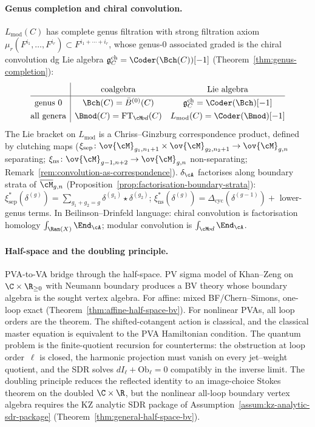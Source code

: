 \paragraph{Genus completion and chiral convolution.}
$L_{\mathrm{mod}}(C)$ has complete genus filtration with strong
filtration axiom $\mu_r(F^{i_1}, \ldots, F^{i_r}) \subset
F^{i_1 + \cdots + i_r}$, whose genus-$0$ associated graded is
the chiral convolution dg Lie algebra
$\mathfrak{g}^{\mathrm{ch}}_C = \Coder(\Bch(C))[-1]$
(Theorem~\ref{thm:genus-completion}):
\[
\renewcommand{\arraystretch}{1.3}
\begin{array}{@{}c|cc@{}}
 & \text{coalgebra} & \text{Lie algebra} \\
\hline
\text{genus } 0
 & \Bch(C) = \bar{B}^{(0)}(C)
 & \mathfrak{g}^{\mathrm{ch}}_C = \Coder(\Bch)[-1]
 \\
\text{all genera}
 & \Bmod(C) = \mathrm{FT}_{\cM\!od}(C)
 & L_{\mathrm{mod}}(C) = \Coder(\Bmod)[-1]
\end{array}
\]
The Lie bracket on $L_{\mathrm{mod}}$ is a Chriss--Ginzburg
correspondence product, defined by clutching maps
($\xi_{\mathrm{sep}}\colon \ov{\cM}_{g_1,n_1+1} \times
\ov{\cM}_{g_2,n_2+1} \to \ov{\cM}_{g,n}$ separating;
$\xi_{\mathrm{ns}}\colon \ov{\cM}_{g-1,n+2} \to \ov{\cM}_{g,n}$
non-separating;
Remark~\ref{rem:convolution-as-correspondence}).
$\delta_\cA$ factorises along boundary strata of
$\overline{\cM}_{g,n}$
(Proposition~\ref{prop:factorisation-boundary-strata}):
$\xi_{\mathrm{sep}}^*(\delta^{(g)}) = \sum_{g_1+g_2=g}
\delta^{(g_1)} \star \delta^{(g_2)}$;
$\xi_{\mathrm{ns}}^*(\delta^{(g)}) =
\Delta_{\mathrm{cyc}}(\delta^{(g-1)}) +$ lower-genus terms.
In Beilinson--Drinfeld language: chiral convolution is
factorisation homology $\int_{\Ran(X)} \End_\cA$; modular
convolution is $\int_{\cM\!od} \End_\cA$.

\paragraph{Half-space and the doubling principle.}
PVA-to-VA bridge through the half-space. PV sigma model of
Khan--Zeng on $\C \times \R_{\ge 0}$ with Neumann boundary
produces a BV theory whose boundary algebra is the sought
vertex algebra. For affine: mixed BF/Chern--Simons, one-loop
exact (Theorem~\ref{thm:affine-half-space-bv}). For nonlinear
PVAs, all loop orders are the theorem. The shifted-cotangent action
is classical, and the classical master equation is equivalent to the
PVA Hamiltonian condition. The quantum problem is the finite-quotient
recursion for counterterms: the obstruction at loop order~$\ell$ is
closed, the harmonic projection must vanish on every jet--weight
quotient, and the SDR solves
$d I_{\ell}+\mathrm{Ob}_{\ell}=0$ compatibly in the inverse limit. The
doubling principle reduces the reflected identity to an image-choice
Stokes theorem on the doubled $\C \times \R$, but the nonlinear
all-loop boundary vertex algebra requires the KZ analytic SDR package of
Assumption~\ref{assum:kz-analytic-sdr-package}
(Theorem~\ref{thm:general-half-space-bv}).

